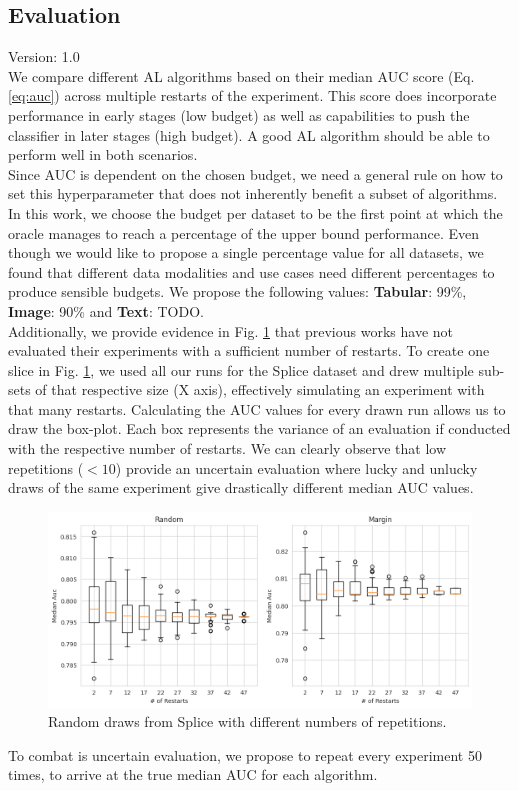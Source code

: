 \documentclass[]{article}
\begin{document}
\subsection{Evaluation}\label{sec:evaluation}
{\color{red} Version: 1.0}\\
We compare different AL algorithms based on their median AUC score (Eq. \ref{eq:auc}) across multiple restarts of the experiment.
This score does incorporate performance in early stages (low budget) as well as capabilities to push the classifier in later stages (high budget).
A good AL algorithm should be able to perform well in both scenarios. \\ [1mm]
Since AUC is dependent on the chosen budget, we need a general rule on how to set this hyperparameter that does not inherently benefit a subset of algorithms.
In this work, we choose the budget per dataset to be the first point at which the oracle manages to reach a percentage of the upper bound performance.
Even though we would like to propose a single percentage value for all datasets, we found that different data modalities and use cases need different percentages to produce sensible budgets.
We propose the following values: \textbf{Tabular}: 99\%, \textbf{Image}: 90\% and \textbf{Text}: {\color{red}TODO}. \\ [1mm]
Additionally, we provide evidence in Fig. \ref{fig:restarts} that previous works have not evaluated their experiments with a sufficient number of restarts.
To create one slice in Fig. \ref{fig:restarts}, we used all our runs for the Splice dataset and drew multiple sub-sets of that respective size (X axis), effectively simulating an experiment with that many restarts.
Calculating the AUC values for every drawn run allows us to draw the box-plot.
Each box represents the variance of an evaluation if conducted with the respective number of restarts.
We can clearly observe that low repetitions ($<10$) provide an uncertain evaluation where lucky and unlucky draws of the same experiment give drastically different median AUC values.
\begin{figure}
	\centering
	\includegraphics[width=\linewidth]{img/ablation_restarts.png}
	\caption{Random draws from Splice with different numbers of repetitions.}
	\label{fig:restarts}
\end{figure}
To combat is uncertain evaluation, we propose to repeat every experiment 50 times, to arrive at the true median AUC for each algorithm.
\end{document}
